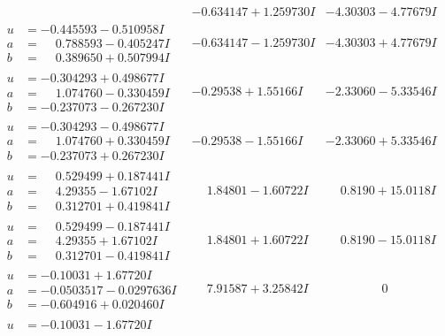 \documentclass[1p]{elsarticle_modified}
\theoremstyle{definition}
\begin{document}
$$\begin{array}{c|c|c}
 & -0.634147 + 1.259730 I & -4.30303 - 4.77679 I \\ \hline\begin{aligned}
u &= -0.445593 - 0.510958 I \\
a &= \phantom{-}0.788593 - 0.405247 I \\
b &= \phantom{-}0.389650 + 0.507994 I\end{aligned}
 & -0.634147 - 1.259730 I & -4.30303 + 4.77679 I \\ \hline\begin{aligned}
u &= -0.304293 + 0.498677 I \\
a &= \phantom{-}1.074760 - 0.330459 I \\
b &= -0.237073 - 0.267230 I\end{aligned}
 & -0.29538 + 1.55166 I & -2.33060 - 5.33546 I \\ \hline\begin{aligned}
u &= -0.304293 - 0.498677 I \\
a &= \phantom{-}1.074760 + 0.330459 I \\
b &= -0.237073 + 0.267230 I\end{aligned}
 & -0.29538 - 1.55166 I & -2.33060 + 5.33546 I \\ \hline\begin{aligned}
u &= \phantom{-}0.529499 + 0.187441 I \\
a &= \phantom{-}4.29355 - 1.67102 I \\
b &= \phantom{-}0.312701 + 0.419841 I\end{aligned}
 & \phantom{-}1.84801 - 1.60722 I & \phantom{-}0.8190 + 15.0118 I \\ \hline\begin{aligned}
u &= \phantom{-}0.529499 - 0.187441 I \\
a &= \phantom{-}4.29355 + 1.67102 I \\
b &= \phantom{-}0.312701 - 0.419841 I\end{aligned}
 & \phantom{-}1.84801 + 1.60722 I & \phantom{-}0.8190 - 15.0118 I \\ \hline\begin{aligned}
u &= -0.10031 + 1.67720 I \\
a &= -0.0503517 - 0.0297636 I \\
b &= -0.604916 + 0.020460 I\end{aligned}
 & \phantom{-}7.91587 + 3.25842 I & \phantom{-0.000000 } 0 \\ \hline\begin{aligned}
u &= -0.10031 - 1.67720 I \\

\end{aligned}
\end{array}$$
\end{document}
